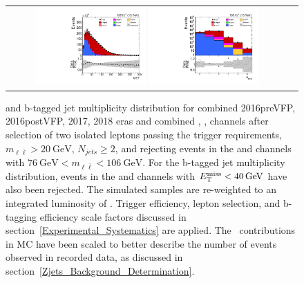 \begin{figure}[htb]
    \begin{center}
        \begin{tabular}{cc}
            \includegraphics[width=0.40\textwidth]{fig_fullRun2UL/controlplots/combined/MET_preMETcut.pdf}
            \includegraphics[width=0.40\textwidth]{fig_fullRun2UL/controlplots/combined/HypBjetMulti_noBTag.pdf}
        \end{tabular}
        \caption{\footnotesize \ETmiss and b-tagged jet multiplicity distribution for combined 2016preVFP, 2016postVFP, 2017, 2018 eras and combined \ee, \emu, \mumu channels after selection of two isolated leptons passing the trigger requirements, $m_{\ell\bar{\ell}} > \SI{20}{\GeV}$, $N_{jets} \geq 2$, and rejecting events in the \ee and \mumu channels with $\SI{76}{\GeV} < m_{\ell\bar{\ell}} < \SI{106}{\GeV}$.
        For the b-tagged jet multiplicity distribution, events in the \ee and \mumu channels with $\ETmiss < \SI{40}{\GeV}$ have also been rejected.
        The simulated samples are re-weighted to an integrated luminosity of \lumivalueRuniiUL.
        Trigger efficiency, lepton selection, and b-tagging efficiency scale factors discussed in section~\ref{Experimental_Systematics} are applied.
        The \zjets\ contributions in MC have been scaled to better describe the number of events observed in recorded data, as discussed in section~\ref{Zjets_Background_Determination}.
        }
    \end{center}
\end{figure}


